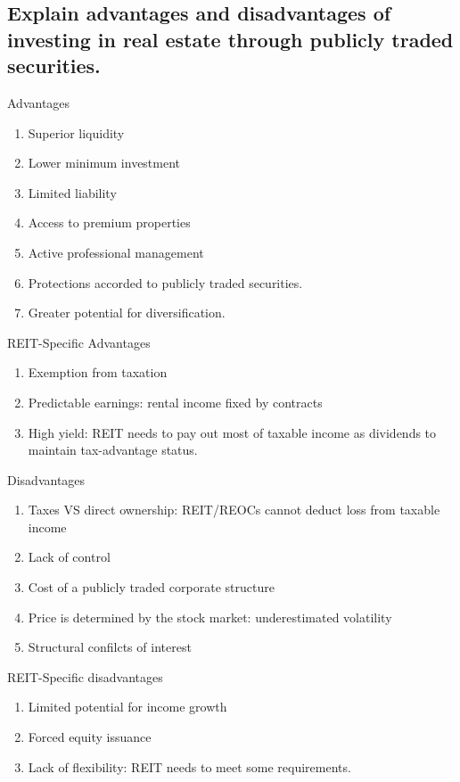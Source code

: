 \documentclass{article}
\newcommand{\be}{\begin{enumerate}}
\newcommand{\ee}{\end{enumerate}}
\begin{document}
\subsection{Explain advantages and disadvantages of investing in real estate through
publicly traded securities.}
Advantages
\be
    \item Superior liquidity
    \item Lower minimum investment
    \item Limited liability
    \item Access to premium properties
    \item Active professional management
    \item Protections accorded to publicly traded securities.
    \item Greater potential for diversification.
\ee
REIT-Specific Advantages
\be
    \item Exemption from taxation
    \item Predictable earnings: rental income fixed by contracts
    \item High yield: REIT needs to pay out most of taxable income as dividends to 
    maintain tax-advantage status.
\ee
Disadvantages
\be
    \item Taxes VS direct ownership: REIT/REOCs cannot deduct loss from taxable income
    \item Lack of control
    \item Cost of a publicly traded corporate structure
    \item Price is determined by the stock market: underestimated volatility
    \item Structural confilcts of interest
\ee
REIT-Specific disadvantages
\be 
    \item Limited potential for income growth
    \item Forced equity issuance
    \item Lack of flexibility: REIT needs to meet some requirements.
\ee
\end{document}
